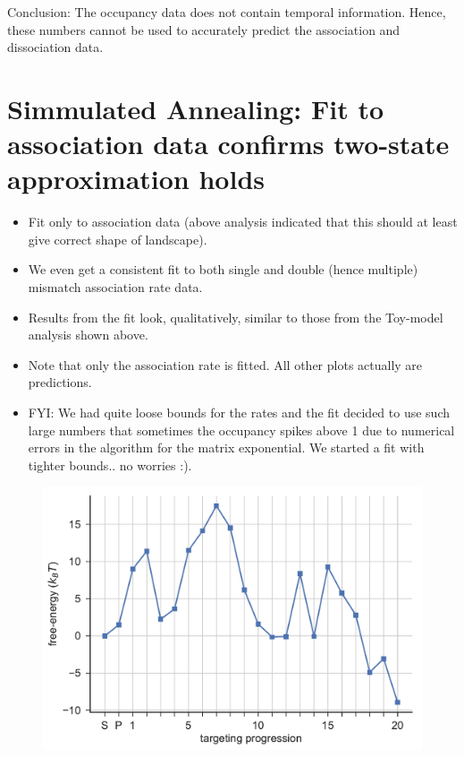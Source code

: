 \documentclass[a4paper,twoside]{revtex4-1}
\begin{document}
Conclusion: The occupancy data does not contain temporal information. Hence, these numbers cannot be used to accurately predict the association and dissociation data.
\section{Simmulated Annealing: Fit to association data confirms two-state approximation holds}
\begin{itemize}
\item Fit only to association data (above analysis indicated that this should at least give correct shape of landscape).
\item We even get a consistent fit to both single and double (hence multiple) mismatch association rate data.
\item Results from the fit look, qualitatively, similar to those from the Toy-model analysis shown above.
\item Note that only the association rate is fitted. All other plots actually are predictions.
\item FYI: We had quite loose bounds for the rates and the fit decided to use such large numbers that sometimes the occupancy spikes above 1 due to numerical errors in the algorithm for the matrix exponential. We started a fit with tighter bounds.. no worries :). 
\end{itemize}


\begin{figure}[H]
\includegraphics[scale=0.5]{fig14_10_10_2018.pdf}
\end{figure}
\end{document}
